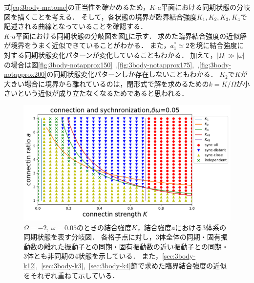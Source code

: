 \documentclass[../main]{subfiles}
\begin{document}
    式\eqref{eq:3body-matome}の正当性を確かめるため，$K$-$a$平面における同期状態の分岐図を描くことを考える．
    そして，各状態の境界が臨界結合強度$K_1,K_2,K_3,K_4$で記述される曲線となっていることを確認する．\\
    $K$-$a$平面における同期状態の分岐図を図\ref{fig:3body-phase}に示す．
    求めた臨界結合強度の近似解が境界をうまく近似できていることがわかる．
    また，$a^\ast_1\simeq 2$を境に結合強度に対する同期状態変化パターンが変化していることもわかる．
    加えて，$|\Omega|\gg|\omega|$の場合は図\ref{fig:3body-notapprox150}\ ,\ref{fig:3body-notapprox175},\ ,\ref{fig:3body-notapprox200}の同期状態変化パターンしか存在しないこともわかる．
    $K_2$で$K$が大きい場合に境界から離れているのは，閉形式で解を求めるための$k=K/\Omega$が小さいという近似が成り立たなくなるためであると思われる．

    \begin{figure}[t]
    \centering
    \includegraphics[width=135mm]{images/three-body-phase.pdf}
    \centering
    \caption{$\Omega=-2,\ \omega=0.05$のときの結合強度$K$，結合強度$a$における3体系の同期状態を表す分岐図．
    各格子点に対し，3体全体の同期・固有振動数の離れた振動子との同期・固有振動数の近い振動子との同期・3体とも非同期の4状態を示している．
    また，\ref{sec:3body-k12},\ \ref{sec:3body-k3},\ \ref{sec:3body-k4}節で求めた臨界結合強度の近似をそれぞれ重ねて示している．
    }
    \label{fig:3body-phase}
    \end{figure}
\end{document}
